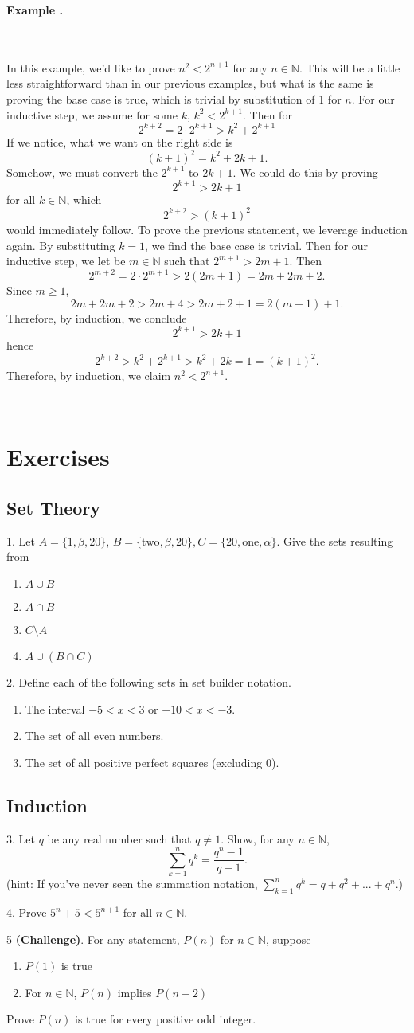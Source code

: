 \documentclass[11pt]{article}
\numberwithin{lemma}{section}
\numberwithin{equation}{section}
\numberwithin{define}{section}
\numberwithin{prop}{section}
\numberwithin{figure}{section}
\numberwithin{theorem}{section}
\newcounter{ex}[section]
\newenvironment{ex}[0]{

	\refstepcounter{ex}
	\begin{large}
    \textbf{Example \theex .}
    \end{large}\\\\
    }
    {
    \\
    }
\numberwithin{ex}{section}
\def\nat{\mathbb{N}}
\begin{document}
\begin{ex}
	In this example, we'd like to prove $n^2<2^{n+1}$ for any $n\in\nat$. This will be a little less straightforward than in our previous examples, but what is the same is proving the base case is true, which is trivial by substitution of 1 for $n$. For our inductive step, we assume for some $k$, $k^2<2^{k+1}$. Then for
	$$2^{k+2}=2\cdot 2^{k+1}>k^2+2^{k+1}$$
	If we notice, what we want on the right side is 
	$$(k+1)^2=k^2+2k+1.$$
	Somehow, we must convert the $2^{k+1}$ to $2k+1$. We could do this by proving 
	$$2^{k+1}>2k+1$$ 
	for all $k\in\nat$, which 
	$$2^{k+2}>(k+1)^2$$ 
	would immediately follow.
	To prove the previous statement, we leverage induction again. By substituting $k=1$, we find the base case is trivial. Then for our inductive step, we let be $m\in\nat$ such that $2^{m+1}>2m+1$.
	Then
	$$2^{m+2}=2\cdot2^{m+1}>2(2m+1)=2m+2m+2.$$
	Since $m\ge 1$,
	$$2m+2m+2>2m+4>2m+2+1=2(m+1)+1.$$
	Therefore, by induction, we conclude 
	$$2^{k+1}>2k+1$$
	hence
	$$2^{k+2}>k^2+2^{k+1}>k^2+2k=1=(k+1)^2.$$
	Therefore, by induction, we claim $n^2<2^{n+1}$.
\end{ex}

\section{Exercises}
\subsection{Set Theory}
1. Let $A=\{1,\beta,20\}$, $B=\{\text{two},\beta,20\},C=\{20,\text{one},\alpha\}$. Give the sets resulting from
\begin{enumerate}[label=\alph*)]
	\item $A \cup B$
	\item $A \cap B$
	\item $C \setminus A$
	\item $A \cup (B\cap C)$
\end{enumerate}
2. Define each of the following sets in set builder notation.
\begin{enumerate}[label=\alph*)]
	\item The interval $-5<x<3$ or $-10<x<-3$.
	\item The set of all even numbers.
	\item The set of all positive perfect squares (excluding 0).
\end{enumerate}
\subsection{Induction}
3. Let $q$ be any real number such that $q\neq1$. Show, for any $n\in\nat$,
$$\sum_{k=1}^nq^k=\frac{q^n-1}{q-1}.$$
(hint: If you've never seen the summation notation, $\sum_{k=1}^nq^k=q+q^2+...+q^n$.)

4. Prove $5^n+5<5^{n+1}$ for all $n\in\nat$.

5 \textbf{(Challenge)}. For any statement, $P(n)$ for $n\in\nat$, suppose 
\begin{enumerate}
	\item $P(1)$ is true
	\item For $n\in\nat$, $P(n)$ implies $P(n+2)$
\end{enumerate}
Prove $P(n)$ is true for every positive odd integer. 
\end{document}
